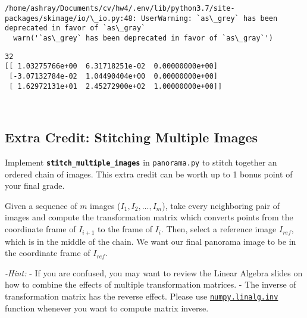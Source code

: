 \documentclass[11pt]{article}
\begin{document}
    \begin{Verbatim}[commandchars=\\\{\}]
/home/ashray/Documents/cv/hw4/.env/lib/python3.7/site-packages/skimage/io/\_io.py:48: UserWarning: `as\_grey` has been deprecated in favor of `as\_gray`
  warn('`as\_grey` has been deprecated in favor of `as\_gray`')

    \end{Verbatim}

    \begin{Verbatim}[commandchars=\\\{\}]
32
[[ 1.03275766e+00  6.31718251e-02  0.00000000e+00]
 [-3.07132784e-02  1.04490404e+00  0.00000000e+00]
 [ 1.62972131e+01  2.45272900e+02  1.00000000e+00]]

    \end{Verbatim}

    \begin{center}
    \end{center}
    { \hspace*{\fill} \\}
    
    \hypertarget{extra-credit-stitching-multiple-images}{%
\subsection{Extra Credit: Stitching Multiple
Images}\label{extra-credit-stitching-multiple-images}}

Implement \textbf{\texttt{stitch\_multiple\_images}} in
\texttt{panorama.py} to stitch together an ordered chain of images. This
extra credit can be worth up to 1 bonus point of your final grade.

Given a sequence of \(m\) images (\(I_1, I_2,...,I_m\)), take every
neighboring pair of images and compute the transformation matrix which
converts points from the coordinate frame of \(I_{i+1}\) to the frame of
\(I_{i}\). Then, select a reference image \(I_{ref}\), which is in the
middle of the chain. We want our final panorama image to be in the
coordinate frame of \(I_{ref}\).

\emph{-Hint:} - If you are confused, you may want to review the Linear
Algebra slides on how to combine the effects of multiple transformation
matrices. - The inverse of transformation matrix has the reverse effect.
Please use
\href{https://docs.scipy.org/doc/numpy/reference/generated/numpy.linalg.inv.html}{\texttt{numpy.linalg.inv}}
function whenever you want to compute matrix inverse.
\end{document}
